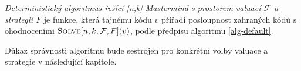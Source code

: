 \begin{definice}\label{defobecnyalg}
    \emph{Deterministický algoritmus řešící [n,k]-Mastermind s prostorem valuací $\mathcal{F}$ a strategií $F$} je funkce, která tajnému kódu $v$ přiřadí posloupnost zahraných kódů s ohodnoceními $\textsc{Solve}[n, k, \mathcal{F}, F](v)$, podle předpisu algoritmu \ref{alg-default}.
    
    
    
\end{definice}
\begin{pozn}
    Důkaz správnosti algoritmu bude sestrojen pro konkrétní volby valuace a strategie v následující kapitole. 
\end{pozn}









